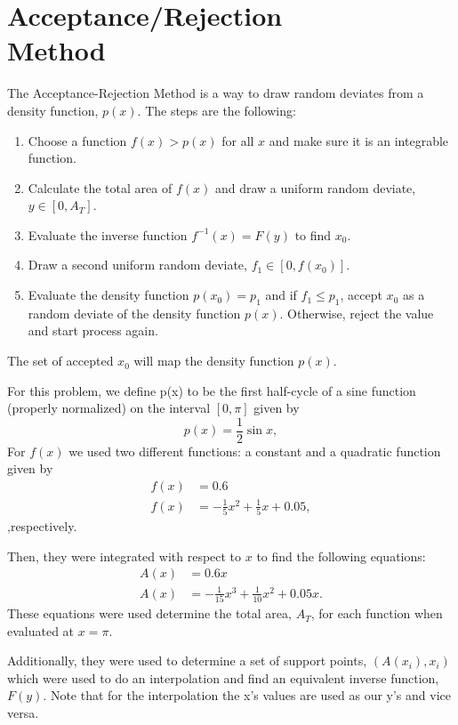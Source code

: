 \section{Acceptance/Rejection \\Method}

The Acceptance-Rejection Method is a way to draw random deviates from a density function, $p(x)$. The steps are the following:
\begin{enumerate}
    \item Choose a function $f(x) > p(x)$ for all $x$ and make sure it is an integrable function.
    \item Calculate the total area of $f(x)$ and draw a uniform random deviate,$y \in [0,A_T]$.
    \item Evaluate the inverse function $f^{-1}(x)=F(y)$ to find $x_0$.
    \item Draw a second uniform random deviate, $f_1 \in[0,f(x_0)]$.
    \item Evaluate the density function $p(x_0)=p_1$ and if $f_1\leq p_1$, accept $x_0$ as a random deviate of the density function $p(x)$. Otherwise, reject the value and start process again.
\end{enumerate}

The set of accepted $x_0$ will map the density function $p(x)$. 

For this problem, we define p(x) to be the first half-cycle of a sine function (properly normalized) on the interval $[0,\pi]$ given by
\begin{equation}
    p(x)=\frac{1}{2}\sin{x},
\end{equation}
For $f(x)$ we used two different functions: a constant and a quadratic function given by 
\begin{align}
    f(x)&=0.6\\
    f(x)&=-\frac{1}{5}x^2 + \frac{1}{5}x+0.05,
\end{align}
,respectively.

Then, they were integrated with respect to $x$ to find the following equations:
\begin{align}
    A(x)&=0.6x\\
    A(x)&=-\frac{1}{15}x^3 + \frac{1}{10}x^2 + 0.05x.
\end{align}
These equations were used determine the total area, $A_T$, for each function when evaluated at $x=\pi$. 

Additionally, they were used to determine a set of support points, $(A(x_i),x_i)$ which were used to do an interpolation and find an equivalent inverse function, $F(y)$. Note that for the interpolation the x's values are used as our y's and vice versa. 

